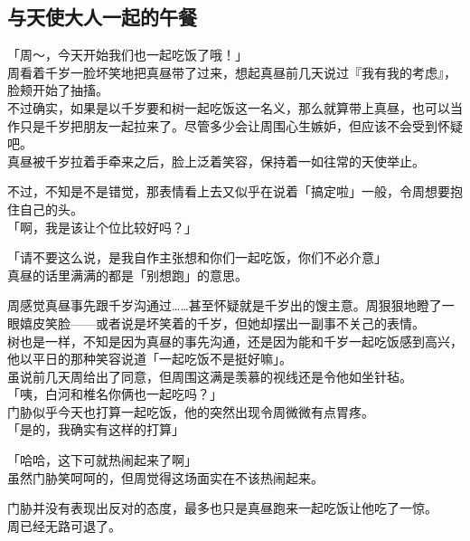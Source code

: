 \subsection{与天使大人一起的午餐}

「周～，今天开始我们也一起吃饭了哦！」\\

周看着千岁一脸坏笑地把真昼带了过来，想起真昼前几天说过『我有我的考虑』，脸颊开始了抽搐。\\

不过确实，如果是以千岁要和树一起吃饭这一名义，那么就算带上真昼，也可以当作只是千岁把朋友一起拉来了。尽管多少会让周围心生嫉妒，但应该不会受到怀疑吧。\\

真昼被千岁拉着手牵来之后，脸上泛着笑容，保持着一如往常的天使举止。

不过，不知是不是错觉，那表情看上去又似乎在说着「搞定啦」一般，令周想要抱住自己的头。\\

「啊，我是该让个位比较好吗？」

「请不要这么说，是我自作主张想和你们一起吃饭，你们不必介意」\\

真昼的话里满满的都是「别想跑」的意思。

周感觉真昼事先跟千岁沟通过……甚至怀疑就是千岁出的馊主意。周狠狠地瞪了一眼嬉皮笑脸——或者说是坏笑着的千岁，但她却摆出一副事不关己的表情。\\

树也是一样，不知是因为真昼的事先沟通，还是因为能和千岁一起吃饭感到高兴，他以平日的那种笑容说道「一起吃饭不是挺好嘛」。\\

虽说前几天周给出了同意，但周围这满是羡慕的视线还是令他如坐针毡。\\

「咦，白河和椎名你俩也一起吃吗？」\\

门胁似乎今天也打算一起吃饭，他的突然出现令周微微有点胃疼。\\

「是的，我确实有这样的打算」

「哈哈，这下可就热闹起来了啊」\\

虽然门胁笑呵呵的，但周觉得这场面实在不该热闹起来。

门胁并没有表现出反对的态度，最多也只是真昼跑来一起吃饭让他吃了一惊。\\

周已经无路可退了。\\

